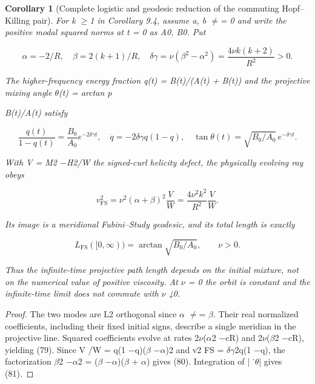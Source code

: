 \documentclass[10pt,letterpaper]{article}
\newtheorem{corollary}[theorem]{Corollary}
\theoremstyle{remark}
\begin{document}
\begin{corollary}[Complete logistic and geodesic reduction of the commuting Hopf–Killing pair]

For k \(\ge \)1 in Corollary 9.4, assume a, b \(\ne \)= 0 and write the positive modal squared norms at t = 0 as A0, B0. Put


\begin{equation}
\tag{78}\label{eq:78}
\alpha=-2/R,\quad\beta=2(k+1)/R,\quad\delta\gamma=\nu(\beta^2-\alpha^2)=\frac{4\nu k(k+2)}{R^2}>0.
\end{equation}

The higher-frequency energy fraction q(t) = B(t)/(A(t) + B(t)) and the projective mixing angle \(\theta \)(t) = arctan p


B(t)/A(t) satisfy



\begin{equation}
\tag{79}\label{eq:79}
\frac{q(t)}{1-q(t)}=\frac{B_0}{A_0}e^{-2\delta\gamma t},\quad\dot q=-2\delta\gamma q(1-q),\quad\tan\theta(t)=\sqrt{B_0/A_0}\,e^{-\delta\gamma t}.
\end{equation}

With V = M2 \(- \)H2/W the signed-curl helicity defect, the physically evolving ray obeys



\begin{equation}
\tag{80}\label{eq:80}
v_{\mathrm{FS}}^2=\nu^2(\alpha+\beta)^2\frac{V}W=\frac{4\nu^2k^2}{R^2}\frac VW.
\end{equation}

Its image is a meridional Fubini–Study geodesic, and its total length is exactly



\begin{equation}
\tag{81}\label{eq:81}
L_{\mathrm{FS}}([0,\infty))=\arctan\sqrt{B_0/A_0},\qquad\nu>0.
\end{equation}

Thus the infinite-time projective path length depends on the initial mixture, not on the numerical value of positive viscosity. At \(\nu \) = 0 the orbit is constant and the infinite-time limit does not commute with \(\nu \) ↓0.


\end{corollary}

\begin{proof}
The two modes are L2 orthogonal since \(\alpha \) \(\ne \)= \(\beta \). Their real normalized coefficients, including their fixed initial signs, describe a single meridian in the projective line. Squared coefficients evolve at rates 2\(\nu \)(\(\alpha \)2 \(- \)cR) and 2\(\nu \)(\(\beta \)2 \(- \)cR), yielding (79). Since V /W = q(1 \(- \)q)(\(\beta \) \(- \alpha \))2 and v2 FS = \(\delta \gamma \)2q(1 \(- \)q), the factorization \(\beta \)2 \(- \alpha \)2 = (\(\beta \) \(- \alpha \))(\(\beta \) + \(\alpha \)) gives (80). Integration of | ˙\(\theta \)| gives (81).

\end{proof}
\end{document}
